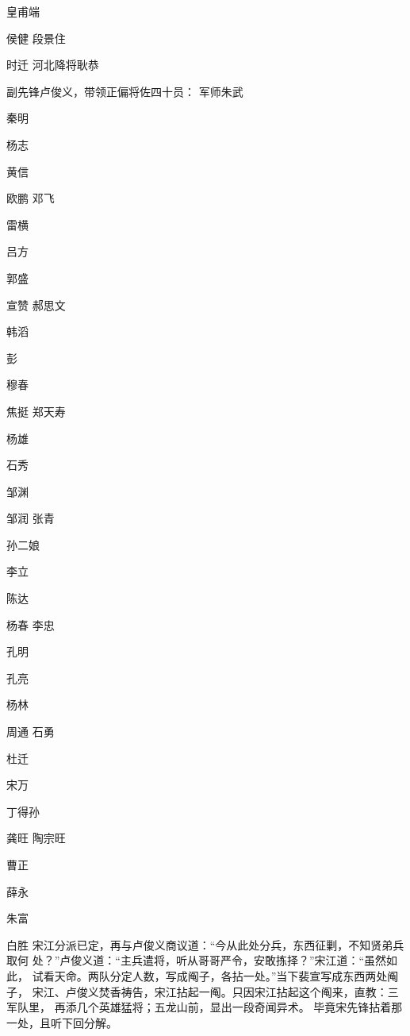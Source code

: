 皇甫端

侯健
段景住

时迁
河北降将耿恭

副先锋卢俊义，带领正偏将佐四十员：
军师朱武

秦明

杨志

黄信

欧鹏
邓飞

雷横

吕方

郭盛

宣赞
郝思文

韩滔

彭

穆春

焦挺
郑天寿

杨雄

石秀

邹渊

邹润
张青

孙二娘

李立

陈达

杨春
李忠

孔明

孔亮

杨林

周通
石勇

杜迁

宋万

丁得孙

龚旺
陶宗旺

曹正

薛永

朱富

白胜
宋江分派已定，再与卢俊义商议道：“今从此处分兵，东西征剿，不知贤弟兵取何
处？”卢俊义道：“主兵遣将，听从哥哥严令，安敢拣择？”宋江道：“虽然如此，
试看天命。两队分定人数，写成阄子，各拈一处。”当下裴宣写成东西两处阄子，
宋江、卢俊义焚香祷告，宋江拈起一阄。只因宋江拈起这个阄来，直教：三军队里，
再添几个英雄猛将；五龙山前，显出一段奇闻异术。
毕竟宋先锋拈着那一处，且听下回分解。